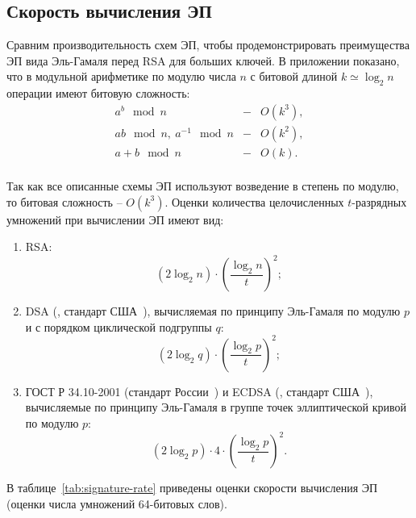 \subsection*{Скорость вычисления ЭП}

Сравним производительность схем ЭП, чтобы продемонстрировать преимущества ЭП вида Эль-Гамаля перед RSA для больших ключей. В приложении показано, что в модульной арифметике по модулю числа $n$ с битовой длиной $k \simeq \log_2 n$ операции имеют битовую сложность:
\[ \begin{array}{lcl}
    a^b \mod n & - & O(k^3), \\
    ab \mod n, ~ a^{-1} \mod n & - & O(k^2), \\
    a+b \mod n & - & O(k). \\
\end{array} \]

Так как все описанные схемы ЭП используют возведение в степень по модулю, то битовая сложность -- $O(k^3)$. Оценки количества целочисленных $t$-разрядных умножений при вычислении ЭП имеют вид:
\begin{enumerate}
    \item RSA:
        \[ (2 \log_2 n) \cdot \left( \frac{\log_2 n}{t} \right)^2; \]
    \item DSA (, стандарт США~\cite{FIPS-PUB-186-4}), вычисляемая по принципу Эль-Гамаля по модулю $p$ и с порядком циклической подгруппы $q$:
        \[ (2 \log_2 q) \cdot \left( \frac{\log_2 p}{t} \right)^2; \]
    \item ГОСТ Р 34.10-2001 (стандарт России~\cite{GOST-2001}) и ECDSA (, стандарт США~\cite{FIPS-PUB-186-4}), вычисляемые по принципу Эль-Гамаля в группе точек эллиптической кривой по модулю $p$:
        \[ (2 \log_2 p) \cdot 4 \cdot \left( \frac{\log_2 p}{t} \right)^2. \]
\end{enumerate}

В таблице~\ref{tab:signature-rate} приведены оценки скорости вычисления ЭП (оценки числа умножений 64-битовых слов).

